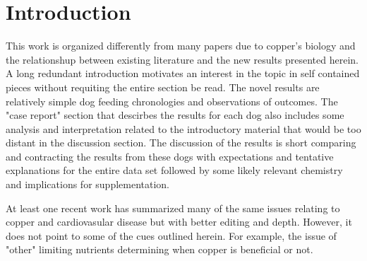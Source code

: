 \section{Introduction  }

This work is organized differently from many papers
due to copper's biology and the relationshup between existing
literature and the new results presented herein.
A long redundant introduction  motivates an interest in the topic
in self contained pieces without requiting the entire section  be read.
The novel results are relatively simple dog feeding chronologies
and observations of outcomes. The "case report" section that
descirbes the results for each dog also includes some analysis
and interpretation related to the   introductory material that would
be too distant in the discussion section. 
The discussion of the results is short  comparing and contracting the results
from these dogs with expectations and tentative explanations for
the entire data set  followed by some likely relevant chemistry and 
implications for supplementation.  


\mjmintro



\mjmmislead



\mjmambig


\mjmcubp


\mjmconfuse


\mjmall


\mjmsulfur


\mjmresolve


\mjmwhy


At least one recent work 
\cite{Chen_Cai_Liang_Copper_homeostasis_copper_2023} has
summarized many of the same issues relating to copper
and cardiovasular disease but with better editing and depth.
However, it does not point to some of the cues outlined herein.
For example, the issue of "other" limiting nutrients determining
when copper is beneficial or not. 


